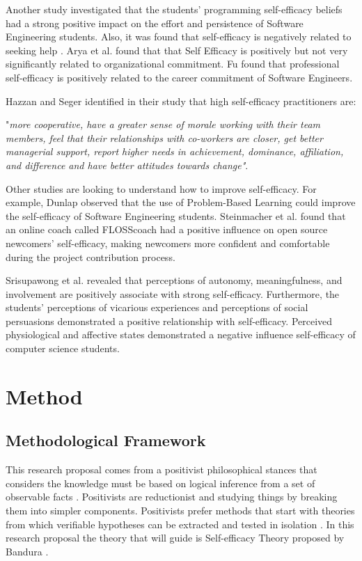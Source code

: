 \documentclass[10pt, conference]{IEEEtran}
\begin{document}
Another study investigated that the students' programming self-efficacy beliefs had a strong positive impact on the effort and persistence of Software Engineering students. Also, it was found that self-efficacy is negatively related to seeking help \cite{kanaparan2017self}. Arya et al.\cite{arya2012moderating} found that that Self Efficacy is positively but not very significantly related to organizational commitment. Fu \cite{fu2010information} found that professional self-efficacy is positively related to the career commitment of Software Engineers. 

Hazzan and Seger \cite{hazzan2010recruiting} identified in their study that high self-efficacy practitioners are:

"\textit{more cooperative, have a greater sense of morale working with their team members, feel that their relationships with co-workers are closer, get better managerial support, report higher needs in achievement, dominance, affiliation, and difference and have better attitudes towards change"}. 


Other studies are looking to understand how to improve self-efficacy. For example, Dunlap \cite{dunlap2005problem} observed that the use of Problem-Based Learning could improve the self-efficacy of Software Engineering students. Steinmacher et al. \cite{steinmacher2015increasing} found that an online coach called FLOSScoach had a positive influence on open source newcomers' self-efficacy, making newcomers more confident and comfortable during the project contribution process.

Srisupawong et al. \cite{srisupawong2018relationship} revealed that perceptions of autonomy, meaningfulness, and involvement are positively associate with strong self-efficacy. Furthermore, the students' perceptions of vicarious experiences and perceptions of social persuasions demonstrated a positive relationship with self-efficacy. Perceived physiological and affective states demonstrated a negative influence self-efficacy of computer science students.
 
\section{Method}

\subsection{Methodological Framework} 

This research proposal comes from a positivist philosophical stances that considers the knowledge must be based on logical inference from a set of observable facts \cite{easterbrook2008selecting}. Positivists are reductionist and studying things by breaking them into simpler components. Positivists prefer methods that start with theories from which verifiable hypotheses can be extracted and tested in isolation \cite{easterbrook2008selecting}. In this research proposal the theory that will guide is Self-efficacy Theory  proposed by Bandura \cite{bandura1977self}.
\end{document}
